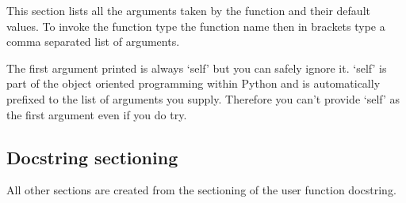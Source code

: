 This section lists all the arguments taken by the function and their default values.
To invoke the function type the function name then in brackets type a comma separated list of arguments.

The first argument printed is always `self' but you can safely ignore it.
`self' is part of the object oriented programming within Python and is automatically prefixed to the list of arguments you supply.
Therefore you can't provide `self' as the first argument even if you do try.


\subsection{Docstring sectioning}

All other sections are created from the sectioning of the user function docstring.


\newpage
\raggedbottom
\twocolumn
{\scriptsize

}
\onecolumn
